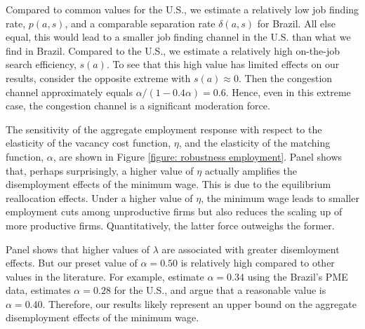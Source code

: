 Compared to common values for the U.S., we estimate a relatively low job finding rate, $p(a,s)$, and a comparable separation rate $\delta(a,s)$ for Brazil. All else equal, this would lead to a smaller job finding channel in the U.S. than what we find in Brazil. Compared to the U.S., we estimate a relatively high on-the-job search efficiency, $s(a)$. To see that this high value has limited effects on our results, consider the opposite extreme with $s(a) \approx 0$. Then the congestion channel approximately equals $\alpha/(1 - 0.4\alpha) = 0.6$. Hence, even in this extreme case, the congestion channel is a significant moderation force.

The sensitivity of the aggregate employment response with respect to the elasticity of the vacancy cost function, $\eta$, and the elasticity of the matching function, $\alpha$, are shown in Figure \ref{figure: robustness employment}.%
%
Panel  shows that, perhaps surprisingly, a higher value of $\eta$ actually amplifies the disemployment effects of the minimum wage. This is due to the equilibrium reallocation effects. Under a higher value of $\eta$, the minimum wage leads to smaller employment cuts among unproductive firms but also reduces the scaling up of more productive firms. Quantitatively, the latter force outweighs the former.

Panel  shows that higher values of $\lambda$ are associated with greater disemloyment effects. But our preset value of $\alpha = 0.50$ is relatively high compared to other values in the literature. For example,  estimate $\alpha = 0.34$ using the Brazil's PME data,  estimates $\alpha=0.28$ for the U.S., and  argue that a reasonable value is $\alpha=0.40$. Therefore, our results likely represent an upper bound on the aggregate disemployment effects of the minimum wage.


